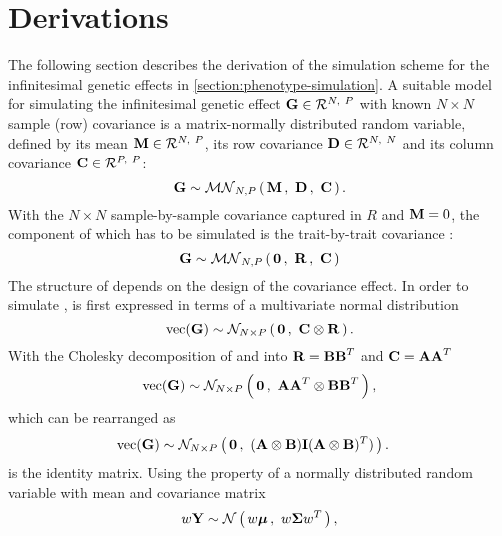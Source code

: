 \chapter{Derivations}
\label{section:simulating-G}
The following section describes the derivation of the simulation scheme for the infinitesimal genetic effects in \cref{section:phenotype-simulation}.
A suitable model for simulating the infinitesimal genetic effect \(\boldsymbol{\mathbf{G}} \in \mathcal{R}^{N,~P}\) with known \(N \times N\) sample (row) covariance is a matrix-normally distributed random variable, defined by its mean \(\boldsymbol{\mathbf{M}} \in \mathcal{R}^{N,~P}\), its row covariance \(\boldsymbol{\mathbf{D}} \in \mathcal{R}^{N,~N}\) and its column covariance \(\boldsymbol{\mathbf{C}} \in \mathcal{R}^{P,~P}\): 
%
\begin{equation}
\boldsymbol{\mathbf{G}} \sim \mathcal{MN}_{N,P}\left(\, \boldsymbol{\mathbf{{M}}} \,,~\boldsymbol{\mathbf{{D}}}\,,~\boldsymbol{\mathbf{{C}}} \,\right).
\label{eq:mvn}
\end{equation}
%
With the \(N \times N\) sample-by-sample covariance captured in \(R\) and  \(\boldsymbol{\mathbf{M}}=0\), the component of  which has to be simulated is the trait-by-trait covariance :
%
\begin{equation}
\boldsymbol{\mathbf{G}} \sim  \mathcal{MN}_{N,P}\left(\, \boldsymbol{\mathbf{{0}}} \,,~\boldsymbol{\mathbf{{R}}}\,,~\boldsymbol{\mathbf{{C}}} \,\right)
\label{eq:G-mvn}
\end{equation}
%
The structure of  depends on the design of the covariance effect. In order to simulate ,  is first expressed in terms of a multivariate normal distribution 
%
\begin{equation}
\text{vec}(\boldsymbol{\mathbf{G}}) \sim \mathcal{N}_{N\times P}\left(\, {\boldsymbol{\mathbf{0}}} \,,~{\boldsymbol{\mathbf{C}} \otimes \boldsymbol{\mathbf{R}}} \,\right).
\end{equation}
%
With the Cholesky decomposition of  and  into  \(\boldsymbol{\mathbf{R}}=\boldsymbol{\mathbf{BB}}^T\) and \(\boldsymbol{\mathbf{C}}=\boldsymbol{\mathbf{AA}}^T\) 
%
\begin{equation}
\text{vec}(\boldsymbol{\mathbf{G}}) \sim \mathcal{N}_{N\times P}\left(\, {\boldsymbol{\mathbf{0}}} \,,~{\boldsymbol{\mathbf{AA}}^T  \otimes \boldsymbol{\mathbf{BB}}^T} \,\right),  
\end{equation}
%
which can be rearranged as 
%
\begin{equation}
\begin{aligned}
\text{vec}(\boldsymbol{\mathbf{G}}) & \sim \mathcal{N}_{N\times P}\left(\, {\boldsymbol{\mathbf{0}}} \,,~{(\boldsymbol{\mathbf{A }}\otimes \boldsymbol{\mathbf{B}}) \boldsymbol{\mathbf{I}} (\boldsymbol{\mathbf{A}} \otimes\boldsymbol{\mathbf{B}})^T)} \,\right). 
\end{aligned}
\end{equation}
 is the identity matrix.
Using the property of a normally distributed random variable  with mean \tmat{\mu} and covariance matrix \tmat{\Sigma}
%
\begin{equation}
\begin{aligned} 
w \boldsymbol{\mathbf{Y}} \sim \mathcal{N}\left(\,{w\boldsymbol{\mathbf{\mu}}}\,,~{w\boldsymbol{\mathbf{\Sigma}} w^T}\,\right),
\end{aligned}
\end{equation}
